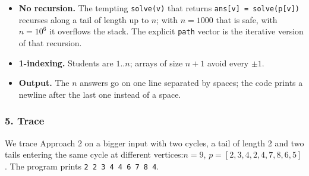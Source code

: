 \begin{tricksbox}
\begin{itemize}[leftmargin=*]
    \item \textbf{No recursion.} The tempting \texttt{solve(v)} that returns \texttt{ans[v] = solve(p[v])} recurses along a tail of length up to $n$; with $n = 1000$ that is safe, with $n = 10^6$ it overflows the stack. The explicit \texttt{path} vector is the iterative version of that recursion.
    \item \textbf{1-indexing.} Students are $1..n$; arrays of size $n+1$ avoid every $\pm 1$.
    \item \textbf{Output.} The $n$ answers go on one line separated by spaces; the code prints a newline after the last one instead of a space.
\end{itemize}
\end{tricksbox}

\subsubsection*{5. Trace}

We trace Approach 2 on a bigger input with two cycles, a tail of length 2 and two tails entering the same cycle at different vertices:\quad $n = 9$, \;$p = [2,3,4,2,4,7,8,6,5]$. The program prints \mbox{\texttt{2 2 3 4 4 6 7 8 4}}.

\begin{diagrambox}
\end{diagrambox}


